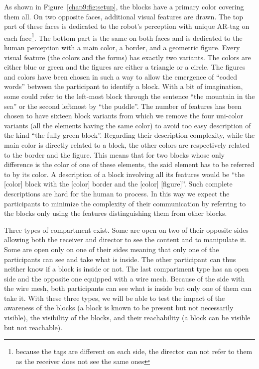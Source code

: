 \documentclass[a4paper,11pt,twoside]{StyleThese}
\begin{document}
As shown in Figure~\ref{chap9:fig:setup}, the blocks have a primary color covering them all. On two opposite faces, additional visual features are drawn. The top part of these faces is dedicated to the robot's perception with unique AR-tag on each face\footnote{because the tags are different on each side, the director can not refer to them as the receiver does not see the same ones}. The bottom part is the same on both faces and is dedicated to the human perception with a main color, a border, and a geometric figure. Every visual feature (the colors and the forms) has exactly two variants. The colors are either blue or green and the figures are either a triangle or a circle.
The figures and colors have been chosen in such a way to allow the emergence of ``coded words'' between the participant to identify a block. With a bit of imagination, some could refer to the left-most block through the sentence ``the mountain in the sea'' or the second leftmost by ``the puddle''.
The number of features has been chosen to have sixteen block variants from which we remove the four uni-color variants (all the elements having the same color) to avoid too easy description of the kind ``the fully green block''.
Regarding their description complexity, while the main color is directly related to a block, the other colors are respectively related to the border and the figure. This means that for two blocks whose only difference is the color of one of these elements, the said element has to be referred to by its color. A description of a block involving all its features would be ``the [color] block with the [color] border and the [color] [figure]''. Such complete descriptions are hard for the human to process. In this way we expect the participants to minimize the complexity of their communication by referring to the blocks only using the features distinguishing them from other blocks.

Three types of compartment exist. Some are open on two of their opposite sides allowing both the receiver and director to see the content and to manipulate it. Some are open only on one of their sides meaning that only one of the participants can see and take what is inside. The other participant can thus neither know if a block is inside or not. The last compartment type has an open side and the opposite one equipped with a wire mesh. Because of the side with the wire mesh, both participants can see what is inside but only one of them can take it. With these three types, we will be able to test the impact of the awareness of the blocks (\eg a block is known to be present but not necessarily visible), the visibility of the blocks, and their reachability (\eg a block can be visible but not reachable).
\end{document}
